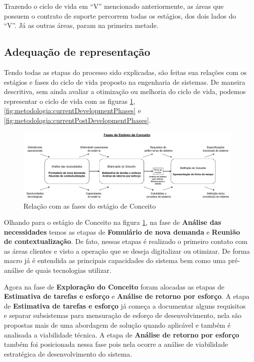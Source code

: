 	Trazendo o ciclo de vida em ``V'' mencionado anteriormente, as áreas que possuem o contrato de suporte percorrem todas os estágios, dos dois lados do ``V''. Já as outras áreas,
	param na primeira metade.

	\subsection{Adequação de representação}

	Tendo todas as etapas do processo sido explicadas, são feitas sua relações com os estágios e fases do ciclo de vida proposto na engenharia de sistemas.
	De maneira descritiva, sem ainda avaliar a otimização ou melhoria do ciclo de vida, podemos representar o ciclo de vida com as figuras \ref{fig:metodologia:currentConceptPhases}, \ref{fig:metodologia:currentDevelopmentPhases} e \ref{fig:metodologia:currentPostDevelopmentPhases}.
	
	\begin{figure}[h]
		\centering
		\includegraphics[width=\textwidth]{./figuras/currentConceptPhases.pdf}
		\caption{Relação com as fases do estágio de Conceito}
		\label{fig:metodologia:currentConceptPhases}
	\end{figure}

	Olhando para o estágio de Conceito na figura \ref{fig:metodologia:currentConceptPhases}, na fase de \textbf{Análise das necessidades} temos as etapas
	de \textbf{Fomulário de nova demanda} e \textbf{Reunião de contextualização}. De fato, nessas etapas é realizado o primeiro contato com as áreas 
	clientes e visto a operação que se deseja digitalizar ou otimizar. De forma macro já é entendida as principais capacidades do sistema bem como uma pré-análise de quais tecnologias utilizar.

	Agora na fase de \textbf{Exploração do Conceito} foram alocadas as etapas de \textbf{Estimativa de tarefas e esforço} e \textbf{Análise de retorno por esforço}. A etapa de
	\textbf{Estimativa de tarefas e esforço} já começa a documentar alguns requisitos e separar subsistemas para mensuração de esforço de desenvolvimento, nela são propostas mais de uma abordagem
	de solução quando aplicável e também é analisada a viabilidade técnica. A etapa de \textbf{Análise de retorno por esforço} também
	foi posicionada nessa fase pois nela ocorre a análise de viabilidade estratégica de desenvolvimento do sistema.

